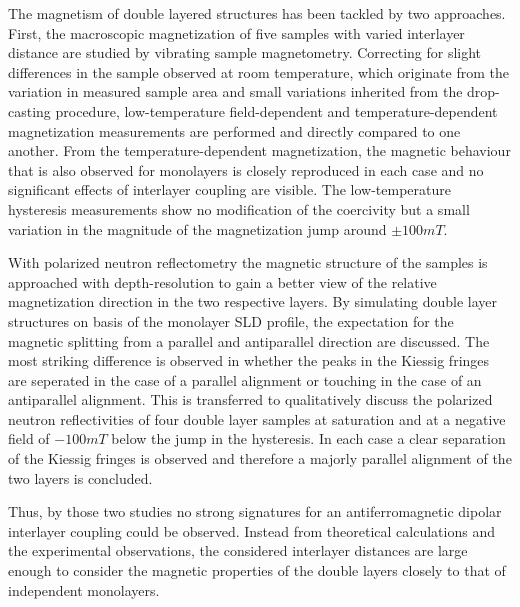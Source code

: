 \documentclass[\main/dresen_thesis.tex]{subfiles}
\begin{document}
  \label{sec:doublelayers:magnetism:summary}
  The magnetism of double layered structures has been tackled by two approaches.
  First, the macroscopic magnetization of five samples with varied interlayer distance are studied by vibrating sample magnetometry.
  Correcting for slight differences in the sample observed at room temperature, which originate from the variation in measured sample area and small variations inherited from the drop-casting procedure, low-temperature field-dependent and temperature-dependent magnetization measurements are performed and directly compared to one another.
  From the temperature-dependent magnetization, the magnetic behaviour that is also observed for monolayers is closely reproduced in each case and no significant effects of interlayer coupling are visible.
  The low-temperature hysteresis measurements show no modification of the coercivity but a small variation in the magnitude of the magnetization jump around $\pm 100 \unit{mT}$.

  With polarized neutron reflectometry the magnetic structure of the samples is approached with depth-resolution to gain a better view of the relative magnetization direction in the two respective layers.
  By simulating double layer structures on basis of the monolayer SLD profile, the expectation for the magnetic splitting from a parallel and antiparallel direction are discussed.
  The most striking difference is observed in whether the peaks in the Kiessig fringes are seperated in the case of a parallel alignment or touching in the case of an antiparallel alignment.
  This is transferred to qualitatively discuss the polarized neutron reflectivities of four double layer samples at saturation and at a negative field of $-100 \unit{mT}$ below the jump in the hysteresis.
  In each case a clear separation of the Kiessig fringes is observed and therefore a majorly parallel alignment of the two layers is concluded.

  Thus, by those two studies no strong signatures for an antiferromagnetic dipolar interlayer coupling could be observed.
  Instead from theoretical calculations and the experimental observations, the considered interlayer distances are large enough to consider the magnetic properties of the double layers closely to that of independent monolayers.
\end{document}
